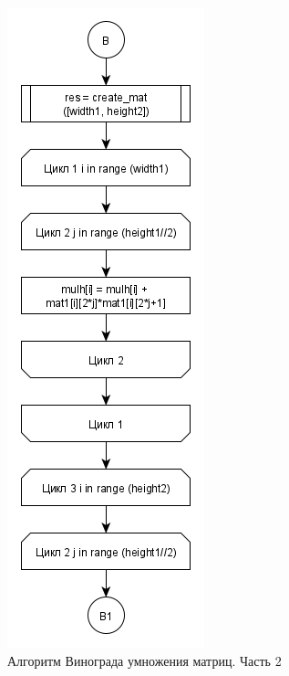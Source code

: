 \documentclass[a4paper,12pt]{report}
\begin{document}
		\begin{figure}[h!]
			\centering
			\includegraphics[width=0.4\linewidth]{part21.png}
			\caption{Алгоритм Винограда умножения матриц. Часть 2}
			\label{ris:wino2}
		\end{figure}
		
		\newpage
		
\end{document}
